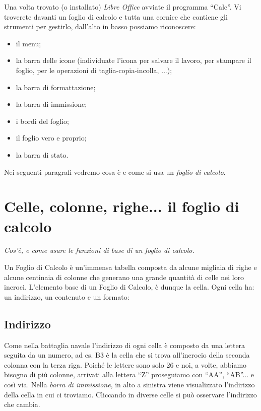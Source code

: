 Una volta trovato (o installato) \emph{Libre Office} avviate il programma ``Calc''.
Vi troverete davanti un foglio di calcolo e tutta una cornice che contiene
gli strumenti per gestirlo, dall'alto in basso possiamo riconoscere:

\begin{itemize} [noitemsep]
\item il menu;
\item {}
la barra delle icone (individuate l'icona per salvare il lavoro,
per stampare il foglio, per le operazioni di taglia-copia-incolla, ...);
\item la barra di formattazione;
\item la barra di immissione;
\item i bordi del foglio;
\item il foglio vero e proprio;
\item la barra di stato.
\end{itemize}

Nei seguenti paragrafi vedremo cosa è e come si usa un \emph{foglio di calcolo}.

\section{Celle, colonne, righe... il foglio di calcolo}
\label{05_01_f_di_calc:celle-colonne-righe-il-foglio-di-calcolo}

\emph{Cos'è, e come usare le funzioni di base di un foglio di calcolo.}

Un Foglio di Calcolo è un'immensa tabella composta da alcune migliaia di
righe e alcune centinaia di colonne che generano una grande quantità di
celle nei loro incroci.
L'elemento base di un Foglio di Calcolo, è dunque la cella.
Ogni cella ha: un indirizzo, un contenuto e un  formato:

\subsection{Indirizzo}
\label{05_01_f_di_calc:indirizzo}

Come nella battaglia navale l'indirizzo di ogni cella è composto da una
lettera seguita da un numero, ad es. B3 è la cella che si trova all'incrocio
della seconda colonna con la terza riga. Poiché le lettere sono solo 26 e
noi, a volte, abbiamo bisogno di più colonne, arrivati alla lettera ``Z''
proseguiamo con ``AA'', ``AB''... e così via.
Nella \emph{barra di immissione}, in alto a sinistra viene visualizzato
l'indirizzo della cella in cui ci troviamo.
Cliccando in diverse celle si può osservare l'indirizzo che cambia.

